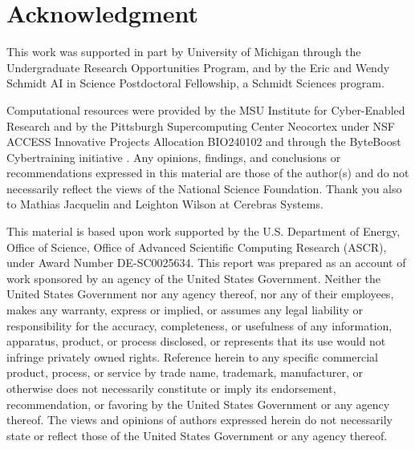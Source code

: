 \section*{Acknowledgment}

This work was supported in part by University of Michigan through the Undergraduate Research Opportunities Program, and by the Eric and Wendy Schmidt AI in Science Postdoctoral Fellowship, a Schmidt Sciences program.

Computational resources were provided by the MSU Institute for Cyber-Enabled Research and by the Pittsburgh Supercomputing Center Neocortex under NSF ACCESS Innovative Projects Allocation BIO240102 \citep{buitrago2021neocortex,boerner2023pearc} and through the ByteBoost Cybertraining initiative \citep{Brashear2025}.
Any opinions, findings, and conclusions or recommendations expressed in this material are those of the author(s) and do not necessarily reflect the views of the National Science Foundation.
Thank you also to Mathias Jacquelin and Leighton Wilson at Cerebras Systems.

This material is based upon work supported by the U.S. Department of Energy, Office of Science, Office of Advanced Scientific Computing Research (ASCR), under Award Number DE-SC0025634.
This report was prepared as an account of work sponsored by an agency of the United States Government.
Neither the United States Government nor any agency thereof, nor any of their employees, makes any warranty, express or implied, or assumes any legal liability or responsibility for the accuracy, completeness, or usefulness of any information, apparatus, product, or process disclosed, or represents that its use would not infringe privately owned rights.
Reference herein to any specific commercial product, process, or service by trade name, trademark, manufacturer, or otherwise does not necessarily constitute or imply its endorsement, recommendation, or favoring by the United States Government or any agency thereof.
The views and opinions of authors expressed herein do not necessarily state or reflect those of the United States Government or any agency thereof.
